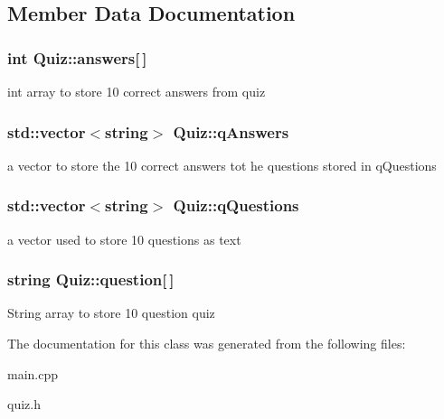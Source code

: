 \subsection{Member Data Documentation}
\hypertarget{class_quiz_a19d4b1d98b6ae6cebda04923b37e2aaf}{}
\subsubsection[{answers}]{\setlength{\rightskip}{0pt plus 5cm}int Quiz\+::answers\mbox{[}$\,$\mbox{]}}\label{class_quiz_a19d4b1d98b6ae6cebda04923b37e2aaf}
int array to store 10 correct answers from quiz \hypertarget{class_quiz_ae4beb2026a9535a66a313dd6a9c6ae3c}{}
\subsubsection[{q\+Answers}]{\setlength{\rightskip}{0pt plus 5cm}std\+::vector$<$string$>$ Quiz\+::q\+Answers}\label{class_quiz_ae4beb2026a9535a66a313dd6a9c6ae3c}
a vector to store the 10 correct answers tot he questions stored in q\+Questions \hypertarget{class_quiz_a2174f8f946d8fbdd2fddcc2a74ad6729}{}
\subsubsection[{q\+Questions}]{\setlength{\rightskip}{0pt plus 5cm}std\+::vector$<$string$>$ Quiz\+::q\+Questions}\label{class_quiz_a2174f8f946d8fbdd2fddcc2a74ad6729}
a vector used to store 10 questions as text \hypertarget{class_quiz_a8d26a1bec061915e1095808386fa64f6}{}
\subsubsection[{question}]{\setlength{\rightskip}{0pt plus 5cm}string Quiz\+::question\mbox{[}$\,$\mbox{]}}\label{class_quiz_a8d26a1bec061915e1095808386fa64f6}
String array to store 10 question quiz 

The documentation for this class was generated from the following files\+:\begin{DoxyCompactItemize}
\item 
main.\+cpp\item 
quiz.\+h\end{DoxyCompactItemize}
